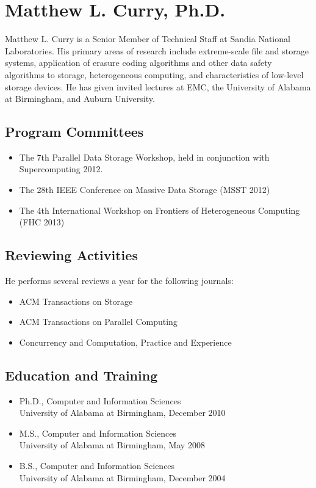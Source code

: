 \documentclass[11pt]{article}
\begin{document}
\section{Matthew L. Curry, Ph.D.}

Matthew L. Curry is a Senior Member of Technical Staff at Sandia
National Laboratories. His primary areas of research include
extreme-scale file and storage systems, application of erasure coding
algorithms and other data safety algorithms to storage, heterogeneous
computing, and characteristics of low-level storage devices. He has
given invited lectures at EMC, the University of Alabama at
Birmingham, and Auburn University.

\subsection{Program Committees}
\begin{itemize}
\item The 7th Parallel Data Storage Workshop, held in conjunction with
  Supercomputing 2012.
\item The 28th IEEE Conference on Massive Data Storage (MSST 2012)
\item The 4th International Workshop on Frontiers of Heterogeneous
  Computing (FHC 2013)
\end{itemize}

\subsection{Reviewing Activities}
He performs several reviews a year for the following journals:
\begin{itemize}
\item ACM Transactions on Storage
\item ACM Transactions on Parallel Computing
\item Concurrency and Computation, Practice and Experience
\end{itemize}

\subsection{Education and Training}
\begin{itemize}
\item Ph.D., Computer and Information Sciences\\ University of Alabama at Birmingham, December 2010
\item M.S., Computer and Information Sciences\\ University of Alabama at Birmingham, May 2008
\item B.S., Computer and Information Sciences\\ University of Alabama at Birmingham, December 2004
\end{itemize}
\end{document}
